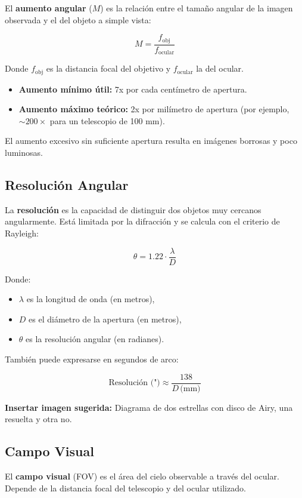 El \textbf{aumento angular} ($M$) es la relación entre el tamaño angular de la imagen observada y el del objeto a simple vista:

\[
M = \frac{f_\text{obj}}{f_\text{ocular}}
\]

Donde $f_\text{obj}$ es la distancia focal del objetivo y $f_\text{ocular}$ la del ocular.

\begin{itemize}
	\item \textbf{Aumento mínimo útil:} 7x por cada centímetro de apertura.
	\item \textbf{Aumento máximo teórico:} 2x por milímetro de apertura (por ejemplo, $\sim200\times$ para un telescopio de 100 mm).
\end{itemize}

El aumento excesivo sin suficiente apertura resulta en imágenes borrosas y poco luminosas.

\subsection{Resolución Angular}

La \textbf{resolución} es la capacidad de distinguir dos objetos muy cercanos angularmente. Está limitada por la difracción y se calcula con el criterio de Rayleigh:

\[
\theta = 1.22 \cdot \frac{\lambda}{D}
\]

Donde:
\begin{itemize}
	\item $\lambda$ es la longitud de onda (en metros),
	\item $D$ es el diámetro de la apertura (en metros),
	\item $\theta$ es la resolución angular (en radianes).
\end{itemize}

También puede expresarse en segundos de arco:

\[
\text{Resolución (")} \approx \frac{138}{D\,\text{(mm)}}
\]

\vspace{0.3cm}
\textbf{Insertar imagen sugerida:} Diagrama de dos estrellas con disco de Airy, una resuelta y otra no.

\subsection{Campo Visual}

El \textbf{campo visual} (FOV) es el área del cielo observable a través del ocular. Depende de la distancia focal del telescopio y del ocular utilizado.

